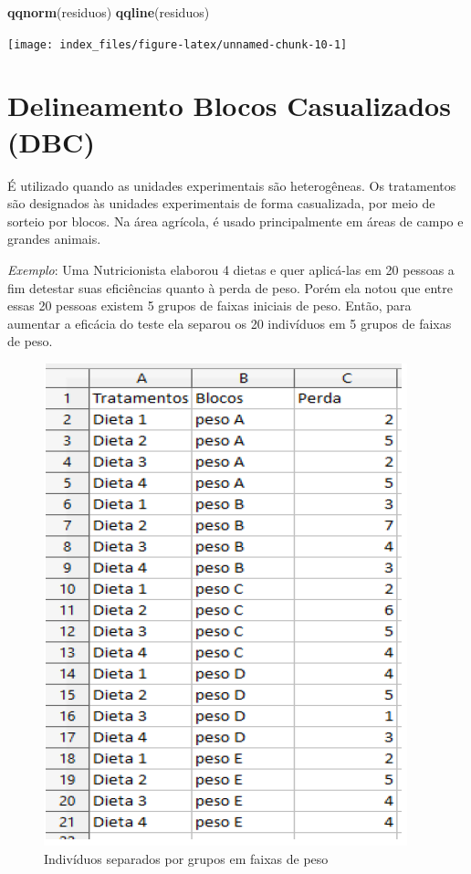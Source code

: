 \documentclass[12pt,brazil,oneside]{book}
\newenvironment{Shaded}{\begin{snugshade}}{\end{snugshade}}
\newcommand{\KeywordTok}[1]{\textcolor[rgb]{0.13,0.29,0.53}{\textbf{#1}}}
\newcommand{\NormalTok}[1]{#1}
\begin{document}
\begin{Shaded}
\begin{Highlighting}[]
\KeywordTok{qqnorm}\NormalTok{(residuos)}
\KeywordTok{qqline}\NormalTok{(residuos)}
\end{Highlighting}
\end{Shaded}

\begin{center}\texttt{[image: index\_files/figure-latex/unnamed-chunk-10-1]} \end{center}

\hypertarget{delineamento-blocos-casualizados-dbc}{%
\section{Delineamento Blocos Casualizados (DBC)}\label{delineamento-blocos-casualizados-dbc}}

É utilizado quando as unidades experimentais são heterogêneas. Os tratamentos são designados às unidades experimentais de forma casualizada, por meio de sorteio por blocos. Na área agrícola, é usado principalmente em áreas de campo e grandes animais.

\emph{Exemplo}: Uma Nutricionista elaborou 4 dietas e quer aplicá-las em 20 pessoas a fim detestar suas eficiências quanto à perda de peso. Porém ela notou que entre essas 20 pessoas existem 5 grupos de faixas iniciais de peso. Então, para aumentar a eficácia do teste ela separou os 20 indivíduos em 5 grupos de faixas de peso.

\begin{figure}[H]

{\centering \includegraphics[width=0.8\linewidth]{delimexp1} 

}

\caption{Indivíduos separados por grupos em faixas de peso}\label{fig:unnamed-chunk-11}
\end{figure}
\end{document}
